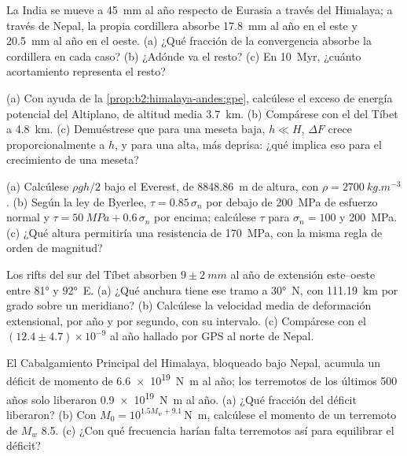 \begin{exercise}[$\star\star$]\label{exo:b2:himalaya-andes:5}
La India se mueve a \qty{45}{mm} al año respecto de Eurasia a través del Himalaya; a través de Nepal, la
propia cordillera absorbe \qty{17.8}{mm} al año en el este y \qty{20.5}{mm} al año en el oeste.
(a) ¿Qué fracción de la convergencia absorbe la cordillera en cada caso? (b) ¿Adónde va el
resto? (c) En \qty{10}{Myr}, ¿cuánto acortamiento representa el resto?
\end{exercise}

\begin{exercise}[$\star\star$]\label{exo:b2:himalaya-andes:6}
(a) Con ayuda de la \cref{prop:b2:himalaya-andes:gpe}, calcúlese el exceso de energía potencial del
Altiplano, de altitud media \qty{3.7}{km}. (b) Compárese con el del Tíbet a \qty{4.8}{km}.
(c) Demuéstrese que para una meseta baja, $h \ll H$, $\Delta F$ crece proporcionalmente a $h$, y para una
alta, más deprisa: ¿qué implica eso para el crecimiento de una meseta?
\end{exercise}

\begin{exercise}[$\star\star$]\label{exo:b2:himalaya-andes:7}
(a) Calcúlese $\rho g h/2$ bajo el Everest, de \qty{8848.86}{m} de altura, con $\rho =
\qty{2700}{kg.m^{-3}}$. (b) Según la ley de Byerlee, $\tau = 0.85\,\sigma_n$ por debajo de \qty{200}{MPa} de
esfuerzo normal y $\tau = \qty{50}{MPa} + 0.6\,\sigma_n$ por encima; calcúlese $\tau$ para $\sigma_n =
100$ y \qty{200}{MPa}. (c) ¿Qué altura permitiría una resistencia de \qty{170}{MPa}, con la misma
regla de orden de magnitud?
\end{exercise}

\begin{exercise}[$\star\star$]\label{exo:b2:himalaya-andes:8}
Los rifts del sur del Tíbet absorben $9 \pm \qty{2}{mm}$ al año de extensión este--oeste entre
\ang{81} y \ang{92}~E. (a) ¿Qué anchura tiene ese tramo a \ang{30}~N, con \qty{111.19}{km} por
grado sobre un meridiano? (b) Calcúlese la velocidad media de deformación extensional, por año y por segundo,
con su intervalo. (c) Compárese con el $(12.4 \pm 4.7) \times 10^{-9}$ al año hallado por GPS al norte de Nepal.
\end{exercise}

\begin{exercise}[$\star\star$]\label{exo:b2:himalaya-andes:9}
El Cabalgamiento Principal del Himalaya, bloqueado bajo Nepal, acumula un déficit de momento de
\qty{6.6e19}{N.m} al año; los terremotos de los últimos 500 años solo liberaron
\qty{0.9e19}{N.m} al año. (a) ¿Qué fracción del déficit liberaron? (b) Con $M_0 =
10^{1.5 M_w + 9.1}$\,\unit{N.m}, calcúlese el momento de un terremoto de $M_w$ 8.5. (c) ¿Con qué frecuencia
harían falta terremotos así para equilibrar el déficit?
\end{exercise}

